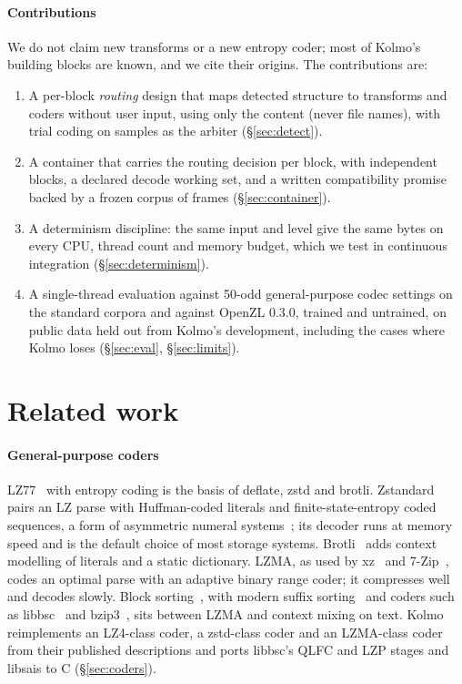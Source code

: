 \documentclass[conference]{IEEEtran}
\begin{document}
\paragraph*{Contributions} We do not claim new transforms or a new entropy coder; most of Kolmo's building blocks are
known, and we cite their origins. The contributions are:
\begin{enumerate}
\item A per-block \emph{routing} design that maps detected structure to transforms and coders without user input,
using only the content (never file names), with trial coding on samples as the arbiter (\S\ref{sec:detect}).
\item A container that carries the routing decision per block, with independent blocks, a declared decode working
set, and a written compatibility promise backed by a frozen corpus of frames (\S\ref{sec:container}).
\item A determinism discipline: the same input and level give the same bytes on every CPU, thread count and memory
budget, which we test in continuous integration (\S\ref{sec:determinism}).
\item A single-thread evaluation against 50-odd general-purpose codec settings on the standard corpora and against
OpenZL 0.3.0, trained and untrained, on public data held out from Kolmo's development, including the cases where
Kolmo loses
(\S\ref{sec:eval}, \S\ref{sec:limits}).
\end{enumerate}

\section{Related work}\label{sec:related}

\paragraph*{General-purpose coders} LZ77~\cite{lz77} with entropy coding is the basis of deflate, zstd and brotli.
Zstandard~\cite{zstd_rfc8878,zstd_web} pairs an LZ parse with Huffman-coded literals and finite-state-entropy coded
sequences, a form of asymmetric numeral systems~\cite{ans}; its decoder runs at memory speed and is the default
choice of most storage systems. Brotli~\cite{brotli_rfc7932,brotli_tois} adds context modelling of literals and a
static dictionary. LZMA, as used by xz~\cite{lzma_xz} and 7-Zip~\cite{lzma_sdk}, codes an optimal parse with an adaptive
binary range coder; it compresses well and decodes slowly. Block sorting~\cite{bwt}, with modern suffix
sorting~\cite{sais,libsais} and coders such as libbsc~\cite{bsc} and bzip3~\cite{bzip3}, sits between LZMA and
context mixing on text. Kolmo reimplements an LZ4-class coder, a zstd-class coder and an LZMA-class coder from their
published descriptions and ports libbsc's QLFC and LZP stages and libsais to C (\S\ref{sec:coders}).
\end{document}
